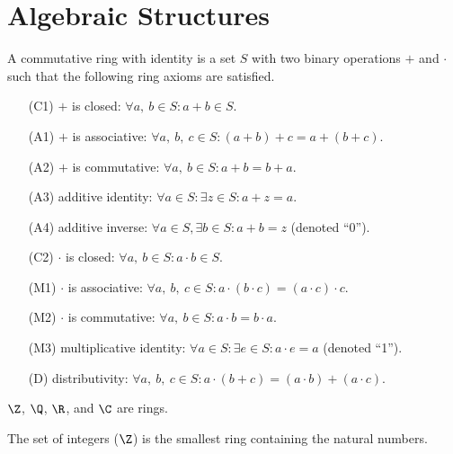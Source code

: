\documentclass{article}
\begin{document}
\section{Algebraic Structures}
\begin{tcolorboxlarge}[title={Ring Axioms}]
    \begin{definition}
        A commutative ring with identity is a set \(S\) with two binary operations \(+\) and \(\cdot\) such that the following ring axioms are satisfied.
    \end{definition}
    \begin{enumerate}[leftmargin=3.5em, itemsep=0.2em, topsep=0.35em]
        \item[(C1)] \(+\) is closed: \(\forall a,\:b \in S: a+b \in S\).
        \item[(A1)] \(+\) is associative: \(\forall a,\:b,\:c \in S: (a+b)+c = a+(b+c)\).
        \item[(A2)] \(+\) is commutative: \(\forall a,\:b \in S: a+b=b+a\).
        \item[(A3)] additive identity: \(\forall a\in S:\exists z \in S:a+z=a\).
        \item[(A4)] additive inverse: \(\forall a \in S, \exists b\in S: a+b = z\) (denoted ``0'').
        \item[(C2)] \(\cdot\) is closed: \(\forall a,\:b \in S: a \cdot b \in S\).
        \item[(M1)] \(\cdot\) is associative: \(\forall a,\:b,\:c \in S:a \cdot (b \cdot c) = (a \cdot c) \cdot c\).
        \item[(M2)] \(\cdot\) is commutative: \(\forall a,\:b \in S:a \cdot b = b \cdot a\).
        \item[(M3)] multiplicative identity: \(\forall a \in S:\exists e \in S:a \cdot e = a\) (denoted ``1'').
        \item[(D)] distributivity: \(\forall a,\:b,\:c \in S: a \cdot (b + c) = (a \cdot b) + (a \cdot c)\).
    \end{enumerate}
\end{tcolorboxlarge}
\begin{note}
    \(\Z\), \(\Q\), \(\R\), and \(\C\) are rings.
\end{note}
%
\begin{definition}[Integers]
    The set of integers (\(\Z\)) is the smallest ring containing the natural numbers.
\end{definition}
\end{document}
